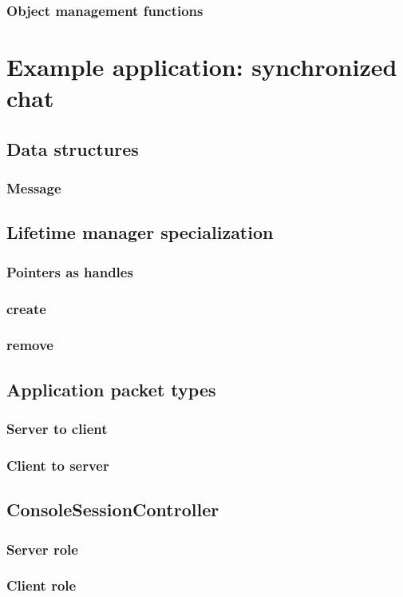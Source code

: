 \documentclass{report}
\begin{document}
			\subsection{Object management functions}

	\newpage

	\chapter{Example application: synchronized chat}
		\section{Data structures}
			\subsection{Message}

		\section{Lifetime manager specialization}
			\subsection{Pointers as handles}
			
			\subsection{create}

			\subsection{remove}

		\section{Application packet types}
			\subsection{Server to client}

			\subsection{Client to server}

		\section{ConsoleSessionController}
			\subsection{Server role}

			\subsection{Client role}
		
	\newpage
\end{document}
